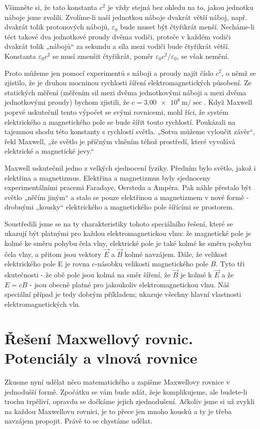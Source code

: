 {  Všimněte si, že tato konstanta \(c^2\) je vždy stejná bez ohledu na to, jakou jednotku náboje 
  jsme zvolili. Zvolíme-li naší jednotkou náboje dvakrát větší náboj, např. dvakrát tolik 
  protonových nábojů, \(\varepsilon_0\) bude muset být čtyřikrát menší. Necháme-li téct takové dva 
  jednotkové proudy dvěma vodiči, proteče v každém vodiči dvakrát tolik „nábojů“ za sekundu a síla 
  mezi vodiči bude čtyřikrát větší. Konstanta \(\varepsilon_0c^2\) se musí zmenšit čtyřikrát, poměr 
  \(\varepsilon_0c^2/\varepsilon_0\), se však nemění. 
 
  Proto můžeme jen pomocí experimentů s náboji a proudy najít číslo \(c^2\), o němž se zjistilo, že 
  je druhou mocninou rychlosti šíření elektromagnetických působení. Ze statických měření (měřením 
  sil mezi dvěma jednotkovými náboji a mezi dvěma jednotkovými proudy) bychom zjistili, že 
  \(c=\SI{3.00e8}{\m/\sec}\). Když Maxwell poprvé uskutečnil tento výpočet se svými rovnicemi, mohl 
  říci, že systém elektrického a magnetického pole se bude šířit touto rychlostí. Poukázali na 
  tajemnou shodu této konstanty s rychlostí světla. „Sotva můžeme vyloučit závěr“, řekl Maxwell, 
  „že světlo je příčným vlněním téhož prostředí, které vyvolává elektrické a magnetické jevy.“ 
 
  Maxwell uskutečnil jedno z velkých sjednocení fyziky. Předním bylo světlo, jakož i elektřina a 
  magnetizmus. Elektřina a magnetizmus byly sjednoceny experimentálními pracemi Faradaye, Oersteda 
  a Ampéra. Pak náhle přestalo být světlo „něčím jiným“ a stalo se pouze elektřinou a magnetizmem v 
  nové formě - drobnými „kousky“ elektrického a magnetického pole šířícími se prostorem. 
 
  Soustředili jsme se na ty charakteristiky tohoto speciálního řešení, které se ukazují být 
  platnými pro každou elektromagnetickou vlnu: že magnetické pole je kolmé ke směru pohybu čela 
  vlny, elektrické pole je také kolmé ke směru pohybu čela vlny, a přitom jsou vektory \(\vec{E}\) 
  a \(\vec{B}\) kolmé navzájem. Dále, že velikost elektrického pole E je rovna \(c\)-násobku 
  velikosti magnetického pole \(B\).  Tyto tři skutečnosti - že obě pole jsou kolmá na směr šíření, 
  že \(\vec{B}\) je kolmé k \(\vec{E}\) a že \(E= cB\) - jsou obecně platné pro jakoukoliv 
  elektromagnetickou vlnu. Náš speciální případ je tedy dobrým příkladem; ukazuje všechny hlavní 
  vlastnosti elektromagnetických vln.
 
\section{Řešení Maxwellový rovnic. Potenciály a vlnová rovnice}\label{fyz:IIchapXVIIIsecV}
  Zkusme nyní udělat něco matematického a zapišme Maxwellovy rovnice v jednodušší formě. Zpočátku 
  se vám bude zdát, žeje komplikujeme, ale budete-li trochu trpěliví, opravdu se dočkáme jejich 
  zjednodušení. Ačkoliv jsme si už zvykli na každou Maxwellovu rovnici, je to přece jen mnoho 
  kousků a ty je třeba navzájem propojit. Právě to se chystáme udělat.
  
}

